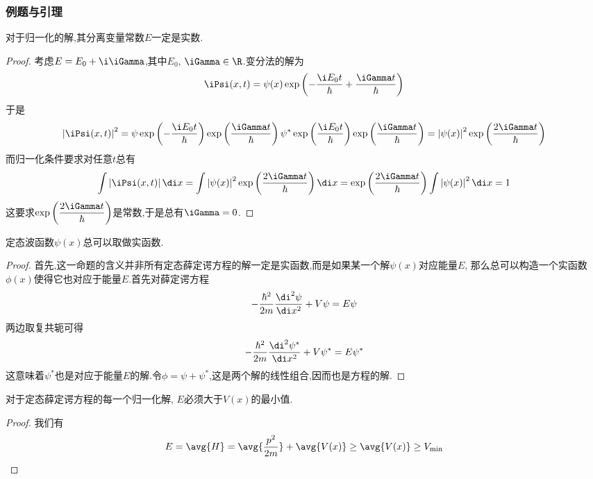 \documentclass{ctexart}
\begin{document}
\subsubsection{例题与引理}
\begin{theorem}
    对于归一化的解,其分离变量常数$E$一定是实数.
\end{theorem}
\begin{proof}
    考虑$E=E_0+\i\iGamma$,其中$E_0$, $\iGamma\in\R$.变分法的解为
    \[\iPsi(x,t)=\psi(x)\exp\left(-\dfrac{\i E_0t}{\hbar}+\dfrac{\iGamma t}{\hbar}\right)\]
    于是
    \[\left|\iPsi(x,t)\right|^2=\psi\exp\left(-\dfrac{\i E_0t}{\hbar}\right)\exp\left(\dfrac{\iGamma t}{\hbar}\right)\psi^\ast\exp\left(\dfrac{\i E_0t}{\hbar}\right)\exp\left(\dfrac{\iGamma t}{\hbar}\right)=\left|\psi(x)\right|^2\exp\left(\dfrac{2\iGamma t}{\hbar}\right)\]
    而归一化条件要求对任意$t$总有
    \[\int\left|\iPsi(x,t)\right|\di x=\int\left|\psi(x)\right|^2\exp\left(\dfrac{2\iGamma t}{\hbar}\right)\di x=\exp\left(\dfrac{2\iGamma t}{\hbar}\right)\int\left|\psi(x)\right|^2\di x=1\]
    这要求$\exp\left(\dfrac{2\iGamma t}{\hbar}\right)$是常数,于是总有$\iGamma=0$.
\end{proof}
\begin{theorem}
    定态波函数$\psi(x)$总可以取做实函数.
\end{theorem}
\begin{proof}
    首先,这一命题的含义并非所有定态薛定谔方程的解一定是实函数,而是如果某一个解$\psi(x)$对应能量$E$, 那么总可以构造一个实函数$\phi(x)$使得它也对应于能量$E$.首先对薛定谔方程
    \[-\dfrac{\hbar^2}{2m}\dfrac{\di^2\psi}{\di x^2}+V\psi=E\psi\]
    两边取复共轭可得
    \[-\dfrac{\hbar^2}{2m}\dfrac{\di^2\psi^\ast}{\di x^2}+V\psi^\ast=E\psi^\ast\]
    这意味着$\psi^\ast$也是对应于能量$E$的解.令$\phi=\psi+\psi^\ast$,这是两个解的线性组合,因而也是方程的解.
\end{proof}
\begin{theorem}
    对于定态薛定谔方程的每一个归一化解, $E$必须大于$V(x)$的最小值.
\end{theorem}
\begin{proof}
    我们有
    \[E=\avg{H}=\avg{\dfrac{p^2}{2m}}+\avg{V(x)}\geq\avg{V(x)}\geq V_{\min}\]
\end{proof}
\end{document}
